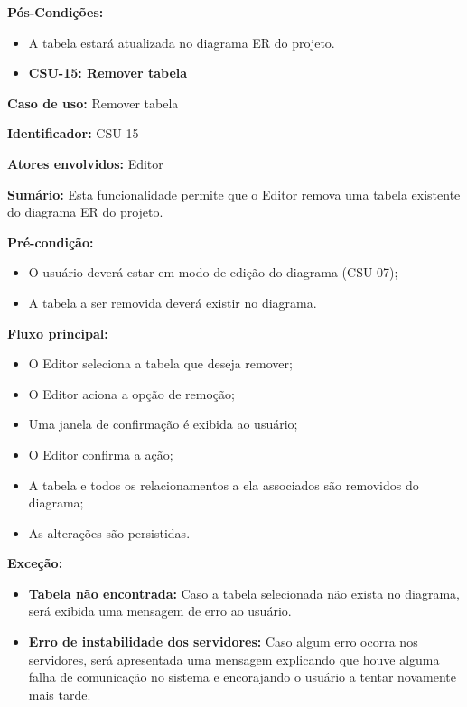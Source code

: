 \textbf{Pós-Condições:}
\begin{itemize}
    \item A tabela estará atualizada no diagrama ER do projeto.
\end{itemize}

\vspace{1em}

\begin{itemize}
    \item \textbf{CSU-15: Remover tabela}
\end{itemize}

\textbf{Caso de uso:} Remover tabela

\textbf{Identificador:} CSU-15

\textbf{Atores envolvidos:} Editor

\textbf{Sumário:} Esta funcionalidade permite que o Editor remova uma tabela existente do diagrama ER do projeto.

\textbf{Pré-condição:}
\begin{itemize}
    \item O usuário deverá estar em modo de edição do diagrama (CSU-07);
    \item A tabela a ser removida deverá existir no diagrama.
\end{itemize}

\textbf{Fluxo principal:}
\begin{itemize}
    \item O Editor seleciona a tabela que deseja remover;
    \item O Editor aciona a opção de remoção;
    \item Uma janela de confirmação é exibida ao usuário;
    \item O Editor confirma a ação;
    \item A tabela e todos os relacionamentos a ela associados são removidos do diagrama;
    \item As alterações são persistidas.
\end{itemize}

\textbf{Exceção:}
\begin{itemize}
    \item \textbf{Tabela não encontrada:} Caso a tabela selecionada não exista no diagrama, será exibida uma mensagem de erro ao usuário.
    \item \textbf{Erro de instabilidade dos servidores:} Caso algum erro ocorra nos servidores, será apresentada uma mensagem explicando que houve alguma falha de comunicação no sistema e encorajando o usuário a tentar novamente mais tarde.
\end{itemize}

